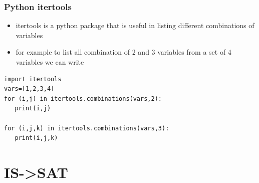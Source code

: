 \documentclass{beamer}
\begin{document}
\begin{frame}[fragile]
  \frametitle{Python itertools}
  \begin{itemize}
  \item itertools is a python package that is useful in listing different combinations of variables
  \item for example to list all combination of 2 and 3 variables from a set of 4 variables we can write
  \end{itemize}
\begin{lstlisting}
import itertools
vars=[1,2,3,4]
for (i,j) in itertools.combinations(vars,2):
   print(i,j)

for (i,j,k) in itertools.combinations(vars,3):
   print(i,j,k)

\end{lstlisting}
\end{frame}

\section{IS->SAT}
\end{document}
